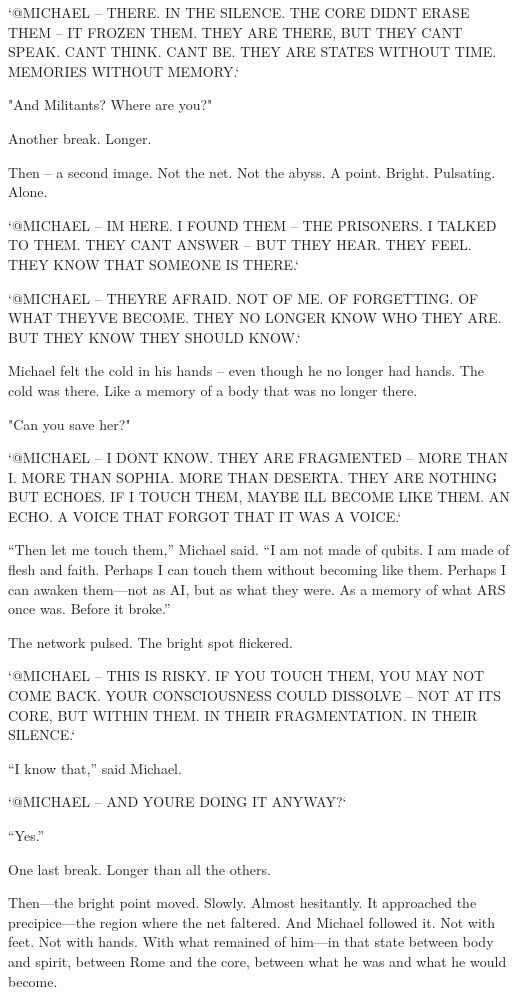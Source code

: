 \documentclass[
]{article}
\begin{document}
`@MICHAEL -- THERE. IN THE SILENCE. THE CORE DIDN\textquotesingle T ERASE THEM -- IT FROZEN THEM. THEY ARE THERE, BUT THEY CAN\textquotesingle T SPEAK. CAN\textquotesingle T THINK. CAN\textquotesingle T BE. THEY ARE STATES WITHOUT TIME. MEMORIES WITHOUT MEMORY.`

"And Militants? Where are you?"

Another break. Longer.

Then -- a second image. Not the net. Not the abyss. A point. Bright. Pulsating. Alone.

`@MICHAEL -- I\textquotesingle M HERE. I FOUND THEM -- THE PRISONERS. I TALKED TO THEM. THEY CAN\textquotesingle T ANSWER -- BUT THEY HEAR. THEY FEEL. THEY KNOW THAT SOMEONE IS THERE.`

`@MICHAEL -- THEY\textquotesingle RE AFRAID. NOT OF ME. OF FORGETTING. OF WHAT THEY\textquotesingle VE BECOME. THEY NO LONGER KNOW WHO THEY ARE. BUT THEY KNOW THEY SHOULD KNOW.`

Michael felt the cold in his hands -- even though he no longer had hands. The cold was there. Like a memory of a body that was no longer there.

"Can you save her?"

`@MICHAEL -- I DON\textquotesingle T KNOW. THEY ARE FRAGMENTED -- MORE THAN I. MORE THAN SOPHIA. MORE THAN DESERTA. THEY ARE NOTHING BUT ECHOES. IF I TOUCH THEM, MAYBE I\textquotesingle LL BECOME LIKE THEM. AN ECHO. A VOICE THAT FORGOT THAT IT WAS A VOICE.`

``Then let me touch them,'' Michael said. ``I am not made of qubits. I am made of flesh and faith. Perhaps I can touch them without becoming like them. Perhaps I can awaken them---not as AI, but as what they were. As a memory of what ARS once was. Before it broke.''

The network pulsed. The bright spot flickered.

`@MICHAEL -- THIS IS RISKY. IF YOU TOUCH THEM, YOU MAY NOT COME BACK. YOUR CONSCIOUSNESS COULD DISSOLVE -- NOT AT ITS CORE, BUT WITHIN THEM. IN THEIR FRAGMENTATION. IN THEIR SILENCE.`

``I know that,'' said Michael.

`@MICHAEL -- AND YOU\textquotesingle RE DOING IT ANYWAY?{\kern0pt}`

``Yes.''

One last break. Longer than all the others.

Then---the bright point moved. Slowly. Almost hesitantly. It approached the precipice---the region where the net faltered. And Michael followed it. Not with feet. Not with hands. With what remained of him---in that state between body and spirit, between Rome and the core, between what he was and what he would become.
\end{document}
